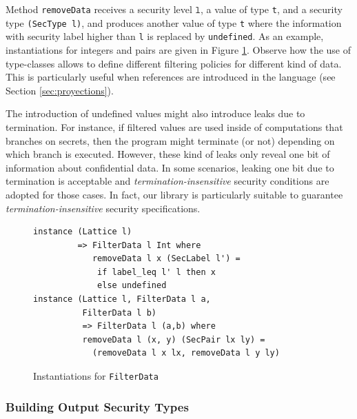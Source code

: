 \documentclass[times, 10pt,twocolumn]{article}
\begin{document}
Method \texttt{removeData} receives a security level $\texttt{l}$, 
a value of type \texttt{t}, and a security type
\texttt{(SecType l)}, and produces another value of type \texttt{t} where 
the information with security label higher than \texttt{l} is 
replaced by \texttt{undefined}. 
As an example, instantiations for 
integers and pairs are given in Figure \ref{fig:FilterData}. 
Observe how the use of type-classes 
allows to define different filtering policies for different kind 
of data. This is particularly useful when references are introduced 
in the language (see Section \ref{sec:proyections}).  

The introduction of undefined values might also introduce leaks
due to termination. 
For instance, if filtered values are used inside of 
computations that branches on 
secrets, then  the program might terminate (or not) depending on 
which branch is executed. 
However, these kind of leaks only reveal one bit of information 
about confidential data. In some scenarios, leaking one bit due to termination 
is acceptable and \emph{termination-insensitive}
security conditions are adopted for those cases.
In fact, our library is particularly suitable to  
guarantee \emph{termination-insensitive} security specifications. 

\begin{figure}
\begin{Verbatim}[fontsize=\footnotesize]
instance (Lattice l) 
         => FilterData l Int where
            removeData l x (SecLabel l') =
             if label_leq l' l then x 
             else undefined
instance (Lattice l, FilterData l a, 
          FilterData l b) 
          => FilterData l (a,b) where
          removeData l (x, y) (SecPair lx ly) =
            (removeData l x lx, removeData l y ly)
\end{Verbatim}
\caption{\label{fig:FilterData}Instantiations for \texttt{FilterData}}
\end{figure}

\subsubsection*{Building Output Security Types}
\end{document}
